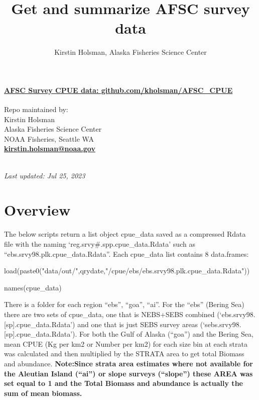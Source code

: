 \documentclass[
]{article}
\title{Get and summarize AFSC survey data}
\author{Kirstin Holsman, Alaska Fisheries Science Center}
\date{}
\newenvironment{Shaded}{\begin{snugshade}}{\end{snugshade}}
\newcommand{\FunctionTok}[1]{\textcolor[rgb]{0.00,0.00,0.00}{#1}}
\newcommand{\NormalTok}[1]{#1}
\newcommand{\StringTok}[1]{\textcolor[rgb]{0.31,0.60,0.02}{#1}}
\begin{document}
\maketitle

{
\setcounter{tocdepth}{2}
\tableofcontents
}
\hypertarget{afsc-survey-cpue-data-github.comkholsmanafsc_cpue}{%
\paragraph{\texorpdfstring{\href{https://github.com/kholsman/AFSC_CPUE}{\textbf{AFSC
Survey CPUE data:
github.com/kholsman/AFSC\_CPUE}}}{AFSC Survey CPUE data: github.com/kholsman/AFSC\_CPUE}}\label{afsc-survey-cpue-data-github.comkholsmanafsc_cpue}}

Repo maintained by:\\
Kirstin Holsman\\
Alaska Fisheries Science Center\\
NOAA Fisheries, Seattle WA\\
\textbf{\url{kirstin.holsman@noaa.gov}}\strut \\
\emph{Last updated: Jul 25, 2023}

\hypertarget{overview}{%
\section{Overview}\label{overview}}

The below scripts return a list object cpue\_data saved as a compressed
Rdata file with the naming `reg.srvy\#.spp.cpue\_data.Rdata' such as
``ebs.srvy98.plk.cpue\_data.Rdata''. Each cpue\_data list contains 8
data.frames:

\begin{Shaded}
\begin{Highlighting}[]
\FunctionTok{load}\NormalTok{(}\FunctionTok{paste0}\NormalTok{(}\StringTok{"data/out/"}\NormalTok{,qrydate,}\StringTok{"/cpue/ebs/ebs.srvy98.plk.cpue\_data.Rdata"}\NormalTok{))}

\FunctionTok{names}\NormalTok{(cpue\_data)}
\end{Highlighting}
\end{Shaded}

There is a folder for each region ``ebs'', ``goa'', ``ai''. For the
``ebs'' (Bering Sea) there are two sets of cpue\_data, one that is
NEBS+SEBS combined (`ebs.srvy98.{[}sp{]}.cpue\_data.Rdata') and one that
is just SEBS survey areas (`sebs.srvy98.{[}sp{]}.cpue\_data.Rdata'). For
both the Gulf of Alaska (``goa'') and the Bering Sea, mean CPUE (Kg per
km2 or Number per km2) for each size bin at each strata was calculated
and then multiplied by the STRATA area to get total Biomass and
abundance. \textbf{Note:Since strata area estimates where not available
for the Aleutian Island (``ai'') or slope surveys (``slope'') these AREA
was set equal to 1 and the Total Biomass and abundance is actually the
sum of mean biomass. }
\end{document}
